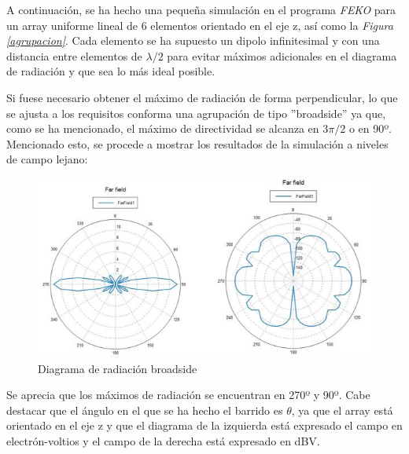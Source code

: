 \documentclass[a4paper,11pt]{book}
\begin{document}
A continuación, se ha hecho una pequeña simulación en el programa \textit{FEKO} para un array uniforme lineal de 6 elementos orientado en el eje z, así como la \textit{Figura \ref{agrupacion}}. Cada elemento se ha supuesto un dipolo infinitesimal y con una distancia entre elementos de $\lambda / 2$ para evitar máximos adicionales en el diagrama de radiación y que sea lo más ideal posible.

Si fuese necesario obtener el máximo de radiación de forma perpendicular, lo que se ajusta a los requisitos conforma una agrupación de tipo ''broadside'' ya que, como se ha mencionado, el máximo de directividad se alcanza en $3 \pi / 2$ o en 90º. Mencionado esto, se procede a mostrar los resultados de la simulación a niveles de campo lejano:
\begin{figure}[hbtp]
\centering
\includegraphics[width = 12cm]{FIGURAS/broadside.JPG}
\caption{Diagrama de radiación broadside}
\label{diagrama180}
\end{figure}

Se aprecia que los máximos de radiación se encuentran en 270º y 90º. Cabe destacar que el ángulo en el que se ha hecho el barrido es $\theta$, ya que el array está orientado en el eje z y que el diagrama de la izquierda está expresado el campo en electrón-voltios y el campo de la derecha está expresado en dBV.
\end{document}
